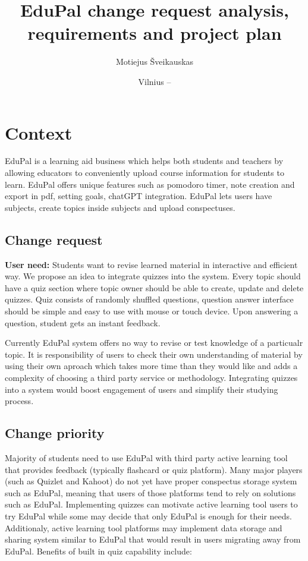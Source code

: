 \documentclass[
    english, %
]{VUMIFPSkursinis}
\title{EduPal change request analysis, requirements and project plan}
\author{Motiejus Šveikauskas}
\date{Vilnius – \the\year}
\begin{document}
\maketitle

\tableofcontents

\section{Context}

EduPal is a learning aid business which helps both students and teachers by allowing educators to conveniently upload course information for students to learn. EduPal offers unique features such as pomodoro timer, note creation and export in pdf, setting goals, chatGPT integration. EduPal lets users have subjects, create topics inside subjects and upload conspectuses.

\subsection{Change request}

\textbf{User need:} Students want to revise learned material in interactive and efficient way. We propose an idea to integrate quizzes into the system. Every topic should have a quiz section where topic owner  should be able to create, update and delete quizzes. Quiz consists of randomly shuffled questions, question answer interface should be simple and easy to use with mouse or touch device. Upon answering a question, student gets an instant feedback.

\vspace{\baselineskip}

Currently EduPal system offers no way to revise or test knowledge of a particualr topic. It is responsibility of users to check their own understanding of material by using their own aproach which takes more time than they would like and adds a complexity of choosing a third party service or methodology. Integrating quizzes into a system would boost engagement of users and simplify their studying process.

\subsection{Change priority}

Majority of students need to use EduPal with third party active learning tool that provides feedback (typically flashcard or quiz platform). Many major players (such as Quizlet and Kahoot) do not yet have proper conspectus storage system such as EduPal, meaning that users of those platforms tend to rely on solutions such as EduPal. Implementing quizzes can motivate active learning tool users to try EduPal while some may decide that only EduPal is enough for their needs. Additionaly, active learning tool platforms may implement data storage and sharing system similar to EduPal that would result in users migrating away from EduPal. Benefits of built in quiz capability include:
\end{document}
